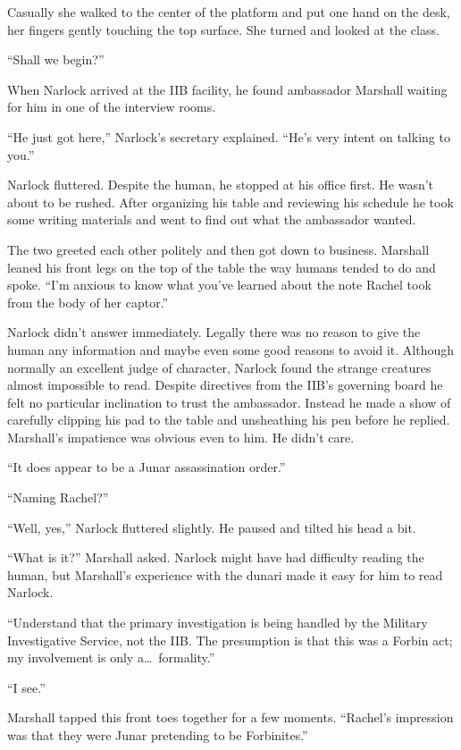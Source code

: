 Casually she walked to the center of the platform and put one hand on the desk, her fingers
gently touching the top surface. She turned and looked at the class.

``Shall we begin?''

\spacebreak

When Narlock arrived at the IIB facility, he found ambassador Marshall waiting for him in one of
the interview rooms.

``He just got here,'' Narlock's secretary explained. ``He's very intent on talking to you.''

Narlock fluttered. Despite the human, he stopped at his office first. He wasn't about to be
rushed. After organizing his table and reviewing his schedule he took some writing materials and
went to find out what the ambassador wanted.

The two greeted each other politely and then got down to business. Marshall leaned his front
legs on the top of the table the way humans tended to do and spoke. ``I'm anxious to know
what you've learned about the note Rachel took from the body of her captor.''

Narlock didn't answer immediately. Legally there was no reason to give the human any information
and maybe even some good reasons to avoid it. Although normally an excellent judge of character,
Narlock found the strange creatures almost impossible to read. Despite directives from the IIB's
governing board he felt no particular inclination to trust the ambassador. Instead he made a
show of carefully clipping his pad to the table and unsheathing his pen before he replied.
Marshall's impatience was obvious even to him. He didn't care.

``It does appear to be a Junar assassination order.''

``Naming Rachel?''

``Well, yes,'' Narlock fluttered slightly. He paused and tilted his head a bit.

``What is it?'' Marshall asked. Narlock might have had difficulty reading the human, but
Marshall's experience with the dunari made it easy for him to read Narlock.

``Understand that the primary investigation is being handled by the Military Investigative
Service, not the IIB. The presumption is that this was a Forbin act; my involvement is only
a\ldots\ formality.''

``I see.''

Marshall tapped this front toes together for a few moments. ``Rachel's impression was that they
were Junar pretending to be Forbinites.''

